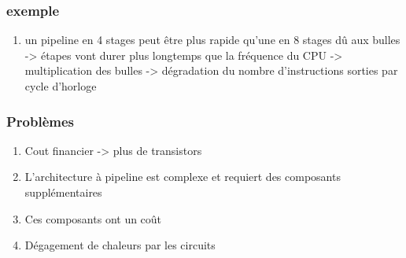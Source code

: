 \subsubsection{exemple}
\begin{enumerate}
\item un pipeline en 4 stages peut être plus rapide qu'une en 8 stages dû aux bulles -> étapes vont durer plus longtemps que la fréquence du CPU -> multiplication des bulles -> dégradation du nombre d'instructions sorties par cycle d'horloge
\end{enumerate}

\subsubsection{Problèmes}
\begin{enumerate}
\item Cout financier -> plus de transistors
\item L'architecture à pipeline est complexe et requiert des composants supplémentaires
\item Ces composants ont un coût
\item Dégagement de chaleurs par les circuits
\end{enumerate}
